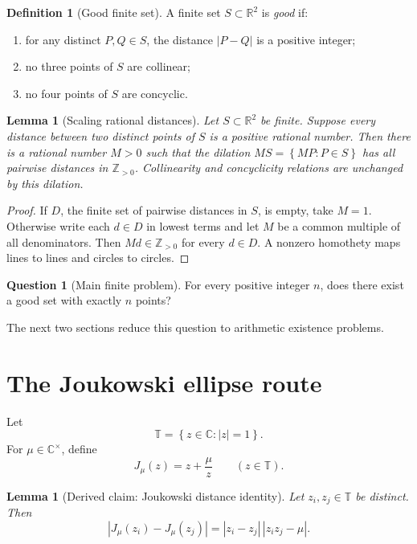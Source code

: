 \documentclass[11pt]{article}
\newtheorem{lemma}[theorem]{Lemma}
\theoremstyle{definition}
\newtheorem{definition}[theorem]{Definition}
\newtheorem{question}[theorem]{Question}
\theoremstyle{remark}
\newcommand{\C}{\mathbb{C}}
\newcommand{\R}{\mathbb{R}}
\newcommand{\Z}{\mathbb{Z}}
\newcommand{\T}{\mathbb{T}}
\newcommand{\abs}[1]{\left|#1\right|}
\newcommand{\set}[1]{\left\{#1\right\}}
\begin{document}
\begin{definition}[Good finite set]
A finite set \(S\subset\R^2\) is \emph{good} if:
\begin{enumerate}
\item for any distinct \(P,Q\in S\), the distance \(\abs{P-Q}\) is a positive
integer;
\item no three points of \(S\) are collinear;
\item no four points of \(S\) are concyclic.
\end{enumerate}
\end{definition}

\begin{lemma}[Scaling rational distances]
Let \(S\subset\R^2\) be finite.  Suppose every distance between two distinct
points of \(S\) is a positive rational number.  Then there is a rational number
\(M>0\) such that the dilation \(MS=\set{MP:P\in S}\) has all pairwise distances
in \(\Z_{>0}\).  Collinearity and concyclicity relations are unchanged by this
dilation.
\end{lemma}

\begin{proof}
If \(D\), the finite set of pairwise distances in \(S\), is empty, take
\(M=1\).  Otherwise write each \(d\in D\) in lowest terms and let \(M\) be a
common multiple of all denominators.  Then \(Md\in\Z_{>0}\) for every
\(d\in D\).  A nonzero homothety maps lines to lines and circles to circles.
\end{proof}

\begin{question}[Main finite problem]
For every positive integer \(n\), does there exist a good set with exactly
\(n\) points?
\end{question}

The next two sections reduce this question to arithmetic existence problems.

\section{The Joukowski ellipse route}

Let
\[
\T=\set{z\in\C:\abs z=1}.
\]
For \(\mu\in\C^\times\), define
\[
J_\mu(z)=z+\frac{\mu}{z}\qquad (z\in\T).
\]

\begin{lemma}[Derived claim: Joukowski distance identity]
Let \(z_i,z_j\in\T\) be distinct.  Then
\[
\abs{J_\mu(z_i)-J_\mu(z_j)}
=
\abs{z_i-z_j}\,\abs{z_i z_j-\mu}.
\]
\end{lemma}
\end{document}

